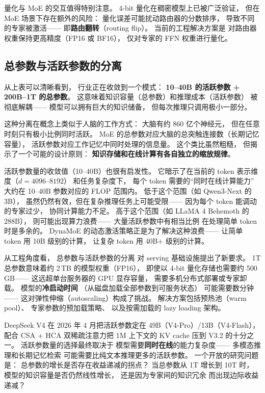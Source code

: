 量化与 MoE 的交互值得特别注意。
4-bit 量化在稠密模型上已被广泛验证，
但在 MoE 场景下存在额外的风险：
量化误差可能扰动路由器的分数排序，
导致不同的专家被激活——
即\textbf{路由翻转}（routing flip）。
当前的工程解决方案是
对路由器权重保持更高精度（FP16 或 BF16），
仅对专家的 FFN 权重进行量化。

\subsection{总参数与活跃参数的分离}

从上表可以清晰看到，
行业正在收敛到一个模式：
\textbf{10--40B 的活跃参数 + 200B--1T 的总参数}。
这意味着知识容量（总参数）和推理成本（活跃参数）
被彻底解耦——
模型可以拥有巨大的知识储备，
但每次推理只调用极小一部分。

这种分离在概念上类似于人脑的工作方式：
大脑有约 860 亿个神经元，
但在任意时刻只有极小比例同时活跃。
MoE 的总参数对应大脑的总突触连接数（长期记忆容量），
活跃参数对应工作记忆中同时处理的信息量。
这个类比虽然粗糙，
但揭示了一个可能的设计原则：
\textbf{知识存储和在线计算有各自独立的缩放规律}。

活跃参数量的收敛值（10--40B）也很有启发性。
它暗示了在当前的 token 表示维度（$d = 4096$--$8192$）
和任务复杂度下，
每个 token 需要的“同时在线计算能力”
大约在 10--40B 参数对应的 FLOP 范围内。
低于这个范围（如 Qwen3-Next 的 3B），
虽然仍然有效，但在复杂推理任务上可能受限——
因为每个 token 能调动的专家过少，
协同计算能力不足。
高于这个范围（如 LLaMA 4 Behemoth 的 288B），
则可能出现算力浪费——
大量活跃参数中有相当比例
在处理简单 token 时是多余的。
DynaMoE 的动态激活策略正是为了解决这种浪费——
让简单 token 用 10B 级别的计算，
让复杂 token 用 40B+ 级别的计算。

从工程角度看，
总参数与活跃参数的分离
对 serving 基础设施提出了新要求。
1T 总参数意味着约 2\,TB 的模型权重（FP16），
即使以 4-bit 量化存储也需要约 500\,GB——
这远超单台服务器的 GPU 显存容量，
需要多机分布式部署或专家卸载。
模型的\textbf{冷启动时间}
（从磁盘加载全部参数到可服务状态）
可能需要数分钟——
这对弹性伸缩（autoscaling）构成了挑战。
解决方案包括预热池（warm pool）、
专家参数的预加载策略、
以及按需加载的 lazy loading 架构。

DeepSeek V4 在 2026 年 4 月把活跃参数定在 49B（V4-Pro）/13B（V4-Flash），
配合 CSA + HCA 双稀疏注意力把 1M 上下文的 KV cache
压到 V3.2 的十分之一。
活跃参数量的选择最终取决于
模型需要\textbf{同时在线}的能力复杂度——
多模态推理和长期记忆检索
可能需要比纯文本推理更多的活跃参数。
一个开放的研究问题是：
总参数的增长是否存在收益递减的拐点？
当总参数从 1T 增长到 10T 时，
模型的知识容量是否仍然线性增长，
还是因为专家间的知识冗余
而出现边际收益递减？

